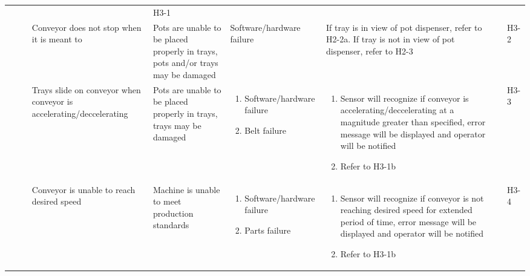 \documentclass{article}
\begin{document}
\begin{landscape}
\begin{center}
\begin{longtable}{|l|  p{3cm}  p{4cm}  p{4cm}  p{4cm}  p{1cm}  p{1cm}|}
\begin{enumerate}[label=(\alph*)]
        \end{enumerate}&
        &
        H3-1\\
        &
        Conveyor does not stop when it is meant to&
        Pots are unable to be placed properly in trays, pots and/or trays may be damaged&
        Software/hardware failure&
        If tray is in view of pot dispenser, refer to H2-2a. If tray is not in view of pot dispenser, refer to H2-3&
        &
        H3-2\\
        &
        Trays slide on conveyor when conveyor is accelerating/deccelerating&
        Pots are unable to be placed properly in trays, trays may be damaged&
        \begin{enumerate}[label=(\alph*)]
            \item Software/hardware failure
            \item Belt failure
        \end{enumerate}&
        \begin{enumerate}[label=(\alph*)]
            \item Sensor will recognize if conveyor is accelerating/deccelerating at a magnitude greater than specified, error message will be displayed and operator will be notified
            \item Refer to H3-1b
        \end{enumerate}&
        &
        H3-3\\

        &
        Conveyor is unable to reach desired speed&
        Machine is unable to meet production standards&
        \begin{enumerate}[label=(\alph*)]
            \item Software/hardware failure
            \item Parts failure
        \end{enumerate}&
        \begin{enumerate}[label=(\alph*)]
            \item  Sensor will recognize if conveyor is not reaching desired speed for extended period of time, error message will be displayed and operator will be notified
            \item Refer to H3-1b
        \end{enumerate}&
        &
        H3-4\\

        \hline


\end{longtable}
\end{center}
\end{landscape}
\end{document}
